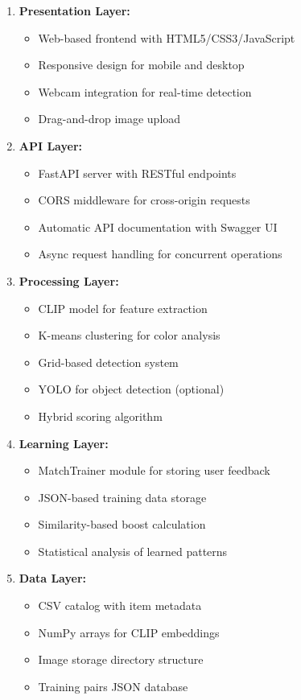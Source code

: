 \documentclass[12pt,a4paper]{report}
\begin{document}
\begin{enumerate}
    \item \textbf{Presentation Layer:}
    \begin{itemize}
        \item Web-based frontend with HTML5/CSS3/JavaScript
        \item Responsive design for mobile and desktop
        \item Webcam integration for real-time detection
        \item Drag-and-drop image upload
    \end{itemize}
    
    \item \textbf{API Layer:}
    \begin{itemize}
        \item FastAPI server with RESTful endpoints
        \item CORS middleware for cross-origin requests
        \item Automatic API documentation with Swagger UI
        \item Async request handling for concurrent operations
    \end{itemize}
    
    \item \textbf{Processing Layer:}
    \begin{itemize}
        \item CLIP model for feature extraction
        \item K-means clustering for color analysis
        \item Grid-based detection system
        \item YOLO for object detection (optional)
        \item Hybrid scoring algorithm
    \end{itemize}
    
    \item \textbf{Learning Layer:}
    \begin{itemize}
        \item MatchTrainer module for storing user feedback
        \item JSON-based training data storage
        \item Similarity-based boost calculation
        \item Statistical analysis of learned patterns
    \end{itemize}
    
    \item \textbf{Data Layer:}
    \begin{itemize}
        \item CSV catalog with item metadata
        \item NumPy arrays for CLIP embeddings
        \item Image storage directory structure
        \item Training pairs JSON database
    \end{itemize}
\end{enumerate}
\end{document}
